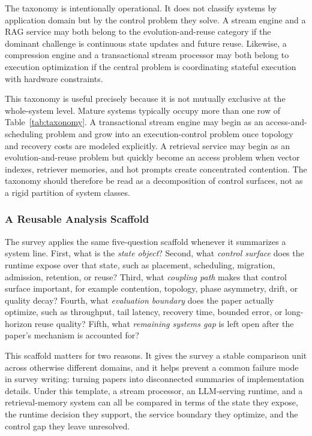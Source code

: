 \documentclass[acmsmall,screen,review]{acmart}
\begin{document}
The taxonomy is intentionally operational. It does not classify systems by application domain but by the control problem they solve. A stream engine and a RAG service may both belong to the evolution-and-reuse category if the dominant challenge is continuous state updates and future reuse. Likewise, a compression engine and a transactional stream processor may both belong to execution optimization if the central problem is coordinating stateful execution with hardware constraints.

This taxonomy is useful precisely because it is not mutually exclusive at the whole-system level. Mature systems typically occupy more than one row of Table~\ref{tab:taxonomy}. A transactional stream engine may begin as an access-and-scheduling problem and grow into an execution-control problem once topology and recovery costs are modeled explicitly. A retrieval service may begin as an evolution-and-reuse problem but quickly become an access problem when vector indexes, retriever memories, and hot prompts create concentrated contention. The taxonomy should therefore be read as a decomposition of control surfaces, not as a rigid partition of system classes.

\subsubsection{A Reusable Analysis Scaffold}

The survey applies the same five-question scaffold whenever it summarizes a system line. First, what is the \emph{state object}? Second, what \emph{control surface} does the runtime expose over that state, such as placement, scheduling, migration, admission, retention, or reuse? Third, what \emph{coupling path} makes that control surface important, for example contention, topology, phase asymmetry, drift, or quality decay? Fourth, what \emph{evaluation boundary} does the paper actually optimize, such as throughput, tail latency, recovery time, bounded error, or long-horizon reuse quality? Fifth, what \emph{remaining systems gap} is left open after the paper's mechanism is accounted for?

This scaffold matters for two reasons. It gives the survey a stable comparison unit across otherwise different domains, and it helps prevent a common failure mode in survey writing: turning papers into disconnected summaries of implementation details. Under this template, a stream processor, an LLM-serving runtime, and a retrieval-memory system can all be compared in terms of the state they expose, the runtime decision they support, the service boundary they optimize, and the control gap they leave unresolved.
\end{document}
